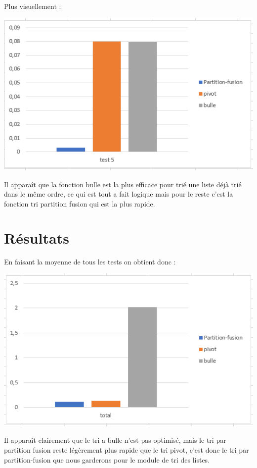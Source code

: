 \documentclass[a4paper, 12pt]{article}
\begin{document}
Plus visuellement : 
\begin{center}
\includegraphics[scale=1]{graphique/test5.PNG} 
\end{center}

Il apparaît que la fonction bulle est la plus efficace pour trié une liste déjà trié dans le même ordre, ce qui est tout a fait logique mais pour le reste c'est la fonction tri partition fusion qui est la plus rapide. \newpage

\section{Résultats}

En faisant la moyenne de tous les tests on obtient donc : 
\begin{center}
\includegraphics[scale=1]{graphique/final.PNG} 
\end{center}

Il apparaît clairement que le tri a bulle n'est pas optimisé, mais le tri par partition fusion reste légèrement plus rapide que le tri pivot, c'est donc le tri par partition-fusion que nous garderons pour le module de tri des listes.
\end{document}
